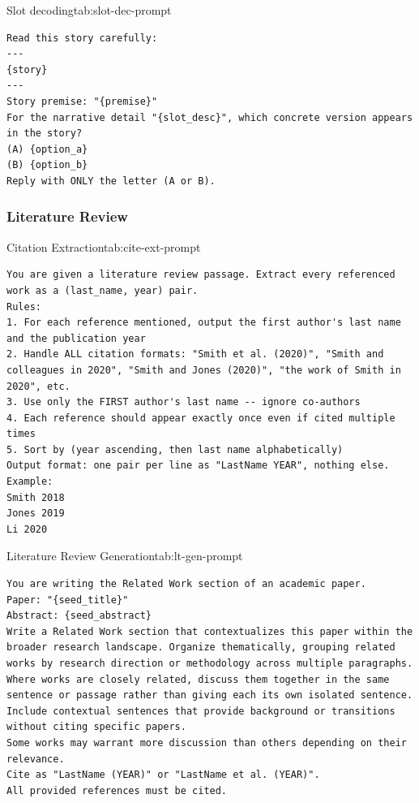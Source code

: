 \begin{prompttable}{Slot decoding}{tab:slot-dec-prompt}
\begin{lstlisting}[style=promptstyle]
Read this story carefully:
---
{story}
---
Story premise: "{premise}"
For the narrative detail "{slot_desc}", which concrete version appears in the story?
(A) {option_a}
(B) {option_b}
Reply with ONLY the letter (A or B).
\end{lstlisting}
\end{prompttable}

\subsubsection{Literature Review}

\begin{prompttable}{Citation Extraction}{tab:cite-ext-prompt}
\begin{lstlisting}[style=promptstyle]
You are given a literature review passage. Extract every referenced work as a (last_name, year) pair.
Rules:
1. For each reference mentioned, output the first author's last name and the publication year
2. Handle ALL citation formats: "Smith et al. (2020)", "Smith and colleagues in 2020", "Smith and Jones (2020)", "the work of Smith in 2020", etc.
3. Use only the FIRST author's last name -- ignore co-authors
4. Each reference should appear exactly once even if cited multiple times
5. Sort by (year ascending, then last name alphabetically)
Output format: one pair per line as "LastName YEAR", nothing else.
Example:
Smith 2018
Jones 2019
Li 2020
\end{lstlisting}
\end{prompttable}

\begin{prompttable}{Literature Review Generation}{tab:lt-gen-prompt}
\begin{lstlisting}[style=promptstyle]
You are writing the Related Work section of an academic paper.
Paper: "{seed_title}"
Abstract: {seed_abstract}
Write a Related Work section that contextualizes this paper within the broader research landscape. Organize thematically, grouping related works by research direction or methodology across multiple paragraphs.
Where works are closely related, discuss them together in the same sentence or passage rather than giving each its own isolated sentence. Include contextual sentences that provide background or transitions without citing specific papers.
Some works may warrant more discussion than others depending on their relevance.
Cite as "LastName (YEAR)" or "LastName et al. (YEAR)".
All provided references must be cited.
\end{lstlisting}
\end{prompttable}

